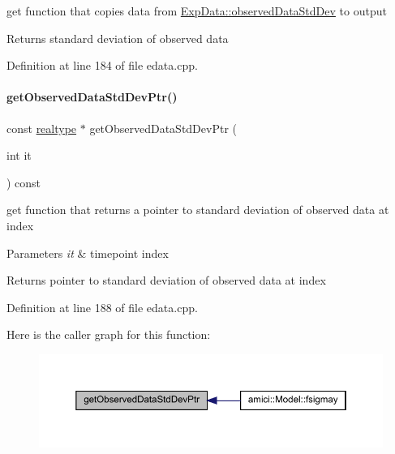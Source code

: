 get function that copies data from \mbox{\hyperlink{classamici_1_1_exp_data_aa097568cebb4be48c4c1dfaab0c2a159}{Exp\+Data\+::observed\+Data\+Std\+Dev}} to output

\begin{DoxyReturn}{Returns}
standard deviation of observed data 
\end{DoxyReturn}


Definition at line 184 of file edata.\+cpp.

\mbox{\label{classamici_1_1_exp_data_ad0ca0d6d8d5b6bb5587570d70bd3a4fc}} 
\paragraph{\texorpdfstring{get\+Observed\+Data\+Std\+Dev\+Ptr()}{getObservedDataStdDevPtr()}}
{\footnotesize\ttfamily const \mbox{\hyperlink{namespaceamici_a1bdce28051d6a53868f7ccbf5f2c14a3}{realtype}} $\ast$ get\+Observed\+Data\+Std\+Dev\+Ptr (\begin{DoxyParamCaption}\item[{int}]{it }\end{DoxyParamCaption}) const}

get function that returns a pointer to standard deviation of observed data at index


\begin{DoxyParams}{Parameters}
{\em it} & timepoint index \\
\hline
\end{DoxyParams}
\begin{DoxyReturn}{Returns}
pointer to standard deviation of observed data at index 
\end{DoxyReturn}


Definition at line 188 of file edata.\+cpp.

Here is the caller graph for this function\+:
\nopagebreak
\begin{figure}[H]
\begin{center}
\leavevmode
\includegraphics[width=350pt]{classamici_1_1_exp_data_ad0ca0d6d8d5b6bb5587570d70bd3a4fc_icgraph}
\end{center}
\end{figure}
\mbox{\label{classamici_1_1_exp_data_ae621c2d67f85f390d01a97658c956098}} 
